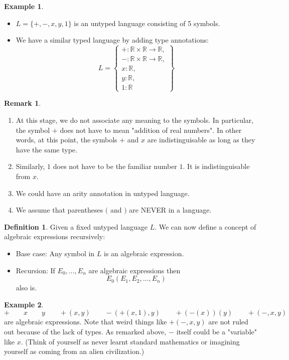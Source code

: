 \documentclass{amsart}
\theoremstyle{definition}
\newtheorem{defn}{Definition}
\newtheorem*{remark}{Remark}
\newtheorem*{example}{Example}
\newcommand{\R}{\mathbb{R}}
\begin{document}
\begin{example}
\begin{itemize}
\item $L = \{+, -, x, y, 1\}$ is an untyped language consisting of 5 symbols.

\item We have a similar typed language by adding type annotations:
$$L = \left\{ \begin{array}{l} + : \R \times \R \rightarrow \R,\\ -: \R \times \R \rightarrow \R,\\ x : \R,\\ y : \R,\\ 1 : \R\end{array}\right\}$$
\end{itemize}
\end{example}

\begin{remark}
\begin{enumerate}
\item At this stage, we do not associate any meaning to the symbols. In particular, the symbol $+$ does not have to mean "addition of real numbers". In other words, at this point, the symbols $+$ and $x$ are indistinguisable as long as they have the same type.
\item Similarly, $1$ does not have to be the familiar number $1$. It is indistinguisable from $x$.
\item We could have an arity annotation in untyped language.
\item We assume that parentheses $($ and $)$ are NEVER in a language.
\end{enumerate}
\end{remark}

\begin{defn}
Given a fixed untyped language $L$. We can now define a concept of algebraic expressions recursively:
\begin{itemize}
\item Base case: Any symbol in $L$ is an algebraic expression.
\item Recursion: If $E_0, ..., E_n$ are algebraic expressions then
$$E_0(E_1, E_2, ..., E_n)$$
also is.
\end{itemize}
\end{defn}

\begin{example}
$$+ \qquad x \qquad y \qquad +(x, y) \qquad -(+(x, 1), y) \qquad +(-(x))(y) \qquad +(-,x,y)$$
are algebraic expressions. Note that weird things like $+(-, x, y)$ are not ruled out because of the lack of types. As remarked above, $-$ itself could be a "variable" like $x$. (Think of yourself as never learnt standard mathematics or imagining yourself as coming from an alien civilization.)
\end{example}
\end{document}
